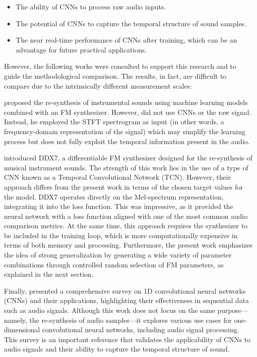 \documentclass[sigconf,natbib=false]{acmart}
\begin{document}
\begin{itemize}
\item The ability of CNNs to process raw audio inputs.
\item The potential of CNNs to capture the temporal structure of sound samples.
\item The near real-time performance of CNNs after training, which can be an advantage for future practical applications.
\end{itemize}

However, the following works were consulted to support this research and to guide the methodological comparison. The results, in fact, are difficult to compare due to the intrinsically different measurement scales:

\textcite{claesson2021resynthesis} proposed the re-synthesis of instrumental sounds using machine learning models combined with an FM synthesizer. However, \textcite{claesson2021resynthesis} did not use CNNs or the raw signal. Instead, he employed the STFT spectrogram as input (in other words, a frequency-domain representation of the signal) which may simplify the learning process but does not fully exploit the temporal information present in the audio.

\textcite{steinmetz2022ddx7} introduced DDX7, a differentiable FM synthesizer designed for the re-synthesis of musical instrument sounds. The strength of this work lies in the use of a type of CNN known as a Temporal Convolutional Network (TCN). However, their approach differs from the present work in terms of the chosen target values for the model. DDX7 operates directly on the Mel-spectrum representation, integrating it into the loss function. This was impressive, as it provided the neural network with a loss function aligned with one of the most common audio comparison metrics. At the same time, this approach requires the synthesizer to be included in the training loop, which is more computationally expensive in terms of both memory and processing. Furthermore, the present work emphasizes the idea of strong generalization by generating a wide variety of parameter combinations through controlled random selection of FM parameters, as explained in the next section.

Finally, \textcite{kiranyaz2021survey} presented a comprehensive survey on 1D convolutional neural networks (CNNs) and their applications, highlighting their effectiveness in sequential data such as audio signals. Although this work does not focus on the same purpose—namely, the re-synthesis of audio samples—it explores various use cases for one-dimensional convolutional neural networks, including audio signal processing. This survey is an important reference that validates the applicability of CNNs to audio signals and their ability to capture the temporal structure of sound.
\end{document}

